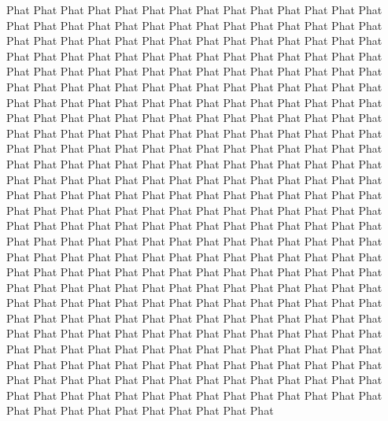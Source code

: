 Phat Phat Phat Phat Phat Phat Phat Phat Phat Phat Phat Phat Phat Phat Phat Phat Phat Phat Phat Phat Phat Phat Phat Phat Phat Phat Phat Phat Phat Phat Phat Phat Phat Phat Phat Phat Phat Phat Phat Phat Phat Phat Phat Phat Phat Phat Phat Phat Phat Phat Phat Phat Phat Phat Phat Phat Phat Phat Phat Phat Phat Phat Phat Phat Phat Phat Phat Phat Phat Phat Phat Phat Phat Phat Phat Phat Phat Phat Phat Phat Phat Phat Phat Phat Phat Phat Phat Phat Phat Phat Phat Phat Phat Phat Phat Phat Phat Phat Phat Phat Phat Phat Phat Phat Phat Phat Phat Phat Phat Phat Phat Phat Phat Phat Phat Phat Phat Phat Phat Phat Phat Phat Phat Phat Phat Phat Phat Phat Phat Phat Phat Phat Phat Phat Phat Phat Phat Phat Phat Phat Phat Phat Phat Phat Phat Phat Phat Phat Phat Phat Phat Phat Phat Phat Phat Phat Phat Phat Phat Phat Phat Phat Phat Phat Phat Phat Phat Phat Phat Phat Phat Phat Phat Phat Phat Phat Phat Phat Phat Phat Phat Phat Phat Phat Phat Phat Phat Phat Phat Phat Phat Phat Phat Phat Phat Phat Phat Phat Phat Phat Phat Phat Phat Phat Phat Phat Phat Phat Phat Phat Phat Phat Phat Phat Phat Phat Phat Phat Phat Phat Phat Phat Phat Phat Phat Phat Phat Phat Phat Phat Phat Phat Phat Phat Phat Phat Phat Phat Phat Phat Phat Phat Phat Phat Phat Phat Phat Phat Phat Phat Phat Phat Phat Phat Phat Phat Phat Phat Phat Phat Phat Phat Phat Phat Phat Phat Phat Phat Phat Phat Phat Phat Phat Phat Phat Phat Phat Phat Phat Phat Phat Phat Phat Phat Phat Phat Phat Phat Phat Phat Phat Phat Phat Phat Phat Phat Phat Phat Phat Phat Phat Phat Phat Phat Phat Phat Phat Phat Phat Phat Phat Phat Phat Phat Phat Phat Phat Phat Phat Phat Phat Phat Phat Phat Phat Phat Phat Phat Phat Phat Phat Phat Phat Phat Phat Phat Phat Phat Phat Phat Phat Phat Phat Phat Phat Phat Phat Phat Phat Phat Phat Phat Phat Phat Phat Phat Phat Phat Phat Phat Phat Phat Phat Phat Phat Phat Phat Phat Phat Phat Phat Phat Phat Phat 